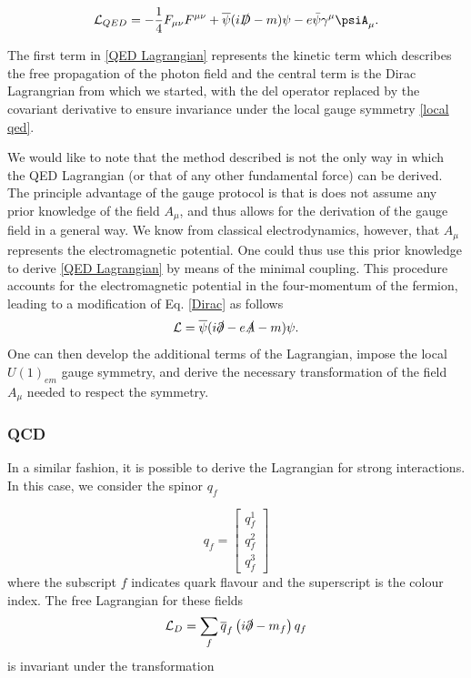 \documentclass[10pt,a4paper]{book}
\begin{document}
\begin{equation}
    \mathcal{L}_{QED} = -\frac{1}{4}F_{\mu\nu}F^{\mu\nu} + \overline{\psi}(i\slashed{D} - m )\psi - e\bar{\psi}\gamma^\mu\psiA_\mu.
\label{QED Lagrangian}
\end{equation}

The first term in \ref{QED Lagrangian} represents the kinetic term which describes the free propagation of the photon field and the central term is the Dirac Lagrangrian from which we started, with the del operator replaced by the covariant derivative to ensure invariance under the local gauge symmetry \ref{local qed}.

We would like to note that the method described is not the only way in which the QED Lagrangian (or that of any other fundamental force) can be derived. The principle advantage of the gauge protocol is that is does not assume any prior knowledge of the field $A_\mu$, and thus allows for the derivation of the gauge field in a general way. We know from classical electrodynamics, however, that $A_\mu$ represents the electromagnetic potential. One could thus use this prior knowledge to derive \ref{QED Lagrangian} by means of the minimal coupling. This procedure accounts for the electromagnetic potential in the four-momentum of the fermion, leading to a modification of Eq. \ref{Dirac} as follows
\begin{equation}
    \mathcal{L} = \overline{\psi}(i\slashed{\partial} - e\slashed{A} - m )\psi.
\end{equation}
One can then develop the additional terms of the Lagrangian, impose the local $U(1)_{em}$ gauge symmetry, and derive the necessary transformation of the field $A_\mu$ needed to respect the symmetry.

\subsubsection{QCD}
\label{QCD}
In a similar fashion, it is possible to derive the Lagrangian for strong interactions. In this case, we consider the spinor $q_f$

\begin{equation}
    q_f = \begin{bmatrix}
        q_f^1 \\
        q_f^2 \\
        q_f^3
    \end{bmatrix}
\end{equation}
where the subscript $f$ indicates quark flavour and the superscript is the colour index.
The free Lagrangian for these fields
\begin{equation}
    \mathcal{L}_D = \sum_f\overline{q}_f\left(i\slashed{\partial} - m_f\right)q_f
\end{equation}
is invariant under the transformation
\end{document}
